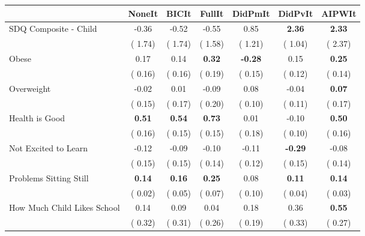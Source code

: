 \begin{tabular}{l c c c c c c}
\toprule
 & NoneIt & BICIt & FullIt & DidPmIt & DidPvIt & AIPWIt \\
\midrule
SDQ Composite - Child &     -0.36 &     -0.52 &     -0.55 &      0.85 & \textbf{      2.36 } & \textbf{     2.33} \\
& (     1.74) & (     1.74) & (     1.58) & (     1.21) & (     1.04) & (     2.37) \\
Obese &      0.17 &      0.14 & \textbf{      0.32 } & \textbf{     -0.28 } &      0.15 & \textbf{     0.25} \\
& (     0.16) & (     0.16) & (     0.19) & (     0.15) & (     0.12) & (     0.14) \\
Overweight &     -0.02 &      0.01 &     -0.09 &      0.08 &     -0.04 & \textbf{     0.07} \\
& (     0.15) & (     0.17) & (     0.20) & (     0.10) & (     0.11) & (     0.17) \\
Health is Good & \textbf{      0.51 } & \textbf{      0.54 } & \textbf{      0.73 } &      0.01 &     -0.10 & \textbf{     0.50} \\
& (     0.16) & (     0.15) & (     0.15) & (     0.18) & (     0.10) & (     0.16) \\
Not Excited to Learn &     -0.12 &     -0.09 &     -0.10 &     -0.11 & \textbf{     -0.29 } &     -0.08 \\
& (     0.15) & (     0.15) & (     0.14) & (     0.12) & (     0.15) & (     0.14) \\
Problems Sitting Still & \textbf{      0.14 } & \textbf{      0.16 } & \textbf{      0.25 } &      0.08 & \textbf{      0.11 } & \textbf{     0.14} \\
& (     0.02) & (     0.05) & (     0.07) & (     0.10) & (     0.04) & (     0.03) \\
How Much Child Likes School &      0.14 &      0.09 &      0.04 &      0.18 &      0.36 & \textbf{     0.55} \\
& (     0.32) & (     0.31) & (     0.26) & (     0.19) & (     0.33) & (     0.27) \\
\bottomrule
\end{tabular}
